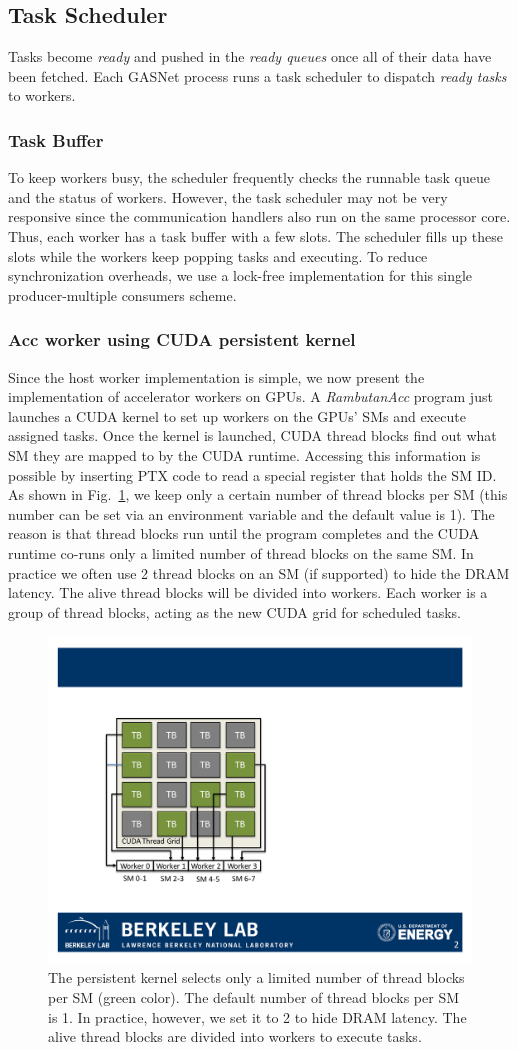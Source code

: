 \subsection{Task Scheduler}
Tasks become {\em ready} and pushed in the {\em ready queues} once all of their data have been fetched.
Each GASNet process runs a task scheduler to dispatch {\em ready tasks} to workers. 

\subsubsection{Task Buffer}
To keep workers busy, the scheduler frequently checks the runnable task queue and the status of workers.
However, the task scheduler may not be very responsive since the communication handlers also run on the same processor core.
Thus, each worker has a task buffer with a few slots.
The scheduler fills up these slots while the workers keep popping tasks and executing.
To reduce synchronization overheads, we use a lock-free implementation for this single producer-multiple consumers scheme.

\subsubsection{Acc worker using CUDA persistent kernel}
Since the host worker implementation is simple, we now present the implementation of accelerator workers on GPUs.
A {\em RambutanAcc} program just launches a CUDA kernel to set up workers on the GPUs' SMs and execute assigned tasks.
Once the kernel is launched, CUDA thread blocks find out what SM they are mapped to by the CUDA runtime.
Accessing this information is possible by inserting PTX code to read a special register that holds the SM ID.
As shown in Fig.~\ref{fig:kernel}, we keep only a certain number of thread blocks per SM (this number can be set via an environment variable and the default value is 1).
The reason is that thread blocks run until the program completes and the CUDA runtime co-runs only a limited number of thread blocks on the same SM.
In practice we often use 2 thread blocks on an SM (if supported) to hide the DRAM latency.
The alive thread blocks will be divided into workers.
Each worker is a group of thread blocks, acting as the new CUDA grid for scheduled tasks.

\begin{figure}[htb]
\centering
\includegraphics[width=.35\textwidth]{figures/kernel_init.pdf}
\caption{The persistent kernel selects only a limited number of thread blocks per SM (green color). The default number of thread blocks per SM is 1. 
In practice, however, we set it to 2 to hide DRAM latency.
The alive thread blocks are divided into workers to execute tasks.}
\label{fig:kernel}
\end{figure}

